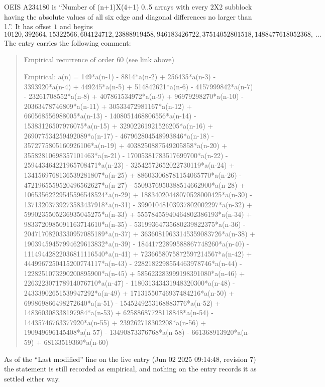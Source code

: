 \documentclass[11pt,a4paper]{article}
\theoremstyle{plain}
\theoremstyle{definition}
\begin{document}
OEIS A234180 is ``Number of (n+1)X(4+1) 0..5 arrays with every 2X2 subblock having the absolute values of all six edge and diagonal differences no larger than 1.''. It has offset $1$ and begins
\[
10120, 392664, 15322566, 604124712, 23888919458, 946183426722, 37514052801518, 1488477618052368,\ \dots
\]
The entry carries the following comment:
\begin{quote}\small
Empirical recurrence of order 60 (see link above)

Empirical: a(n) = 149*a(n-1) - 8814*a(n-2) + 256435*a(n-3) - 3393920*a(n-4) + 449245*a(n-5) + 514842621*a(n-6) - 4157999842*a(n-7) - 23261708552*a(n-8) + 407861534972*a(n-9) + 96979298270*a(n-10) - 20363478746809*a(n-11) + 30533472981167*a(n-12) + 660568556988005*a(n-13) - 1408051468806556*a(n-14) - 15383126507976075*a(n-15) + 32902261921526205*a(n-16) + 269077534259492089*a(n-17) - 467962804548993846*a(n-18) - 3572775805160926106*a(n-19) + 4038250887549205858*a(n-20) + 35582810698357101463*a(n-21) - 17005381783517699700*a(n-22) - 259443464221965708471*a(n-23) - 32542572652022730119*a(n-24) + 1341569768136539281807*a(n-25) + 886033068781154065770*a(n-26) - 4721965559520496562627*a(n-27) - 5509376950388514662900*a(n-28) + 10653562229545596548524*a(n-29) + 18834020448070528000425*a(n-30) - 13713203739273583437918*a(n-31) - 39901048103937802002297*a(n-32) + 5990235505236935045275*a(n-33) + 55578455940464802386193*a(n-34) + 9833720985091163714610*a(n-35) - 53199364735680239822375*a(n-36) - 20471708203330957085189*a(n-37) + 36360819633145359083726*a(n-38) + 19039459457994629613832*a(n-39) - 18441722899588867748260*a(n-40) - 11149442822036811116540*a(n-41) + 7236658075872597214567*a(n-42) + 4449967250415200774117*a(n-43) - 2282182298554463978746*a(n-44) - 1228251073290200895900*a(n-45) + 585623283999198391080*a(n-46) + 226322307178914076710*a(n-47) - 118031343431948320300*a(n-48) - 24333902651539947292*a(n-49) + 17131550746937484216*a(n-50) + 699869866498272640*a(n-51) - 1545249253168883776*a(n-52) + 148360308338197984*a(n-53) + 62588687728118848*a(n-54) - 14435746763377920*a(n-55) + 239262718302208*a(n-56) + 190949696145408*a(n-57) - 13490873376768*a(n-58) - 661368913920*a(n-59) + 68133519360*a(n-60)
\end{quote}
As of the ``Last modified'' line on the live entry (Jun 02 2025 09:14:48, revision 7) the statement is
still recorded as empirical, and nothing on the entry records it as settled either way.
\end{document}
